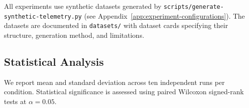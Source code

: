 All experiments use synthetic datasets generated by
\texttt{scripts/generate-synthetic-telemetry.py} (see
Appendix~\ref{app:experiment-configurations}). The datasets are documented in
\texttt{datasets/} with dataset cards specifying their structure, generation
method, and limitations.

\subsection{Statistical Analysis}

We report mean and standard deviation across ten independent runs per condition.
Statistical significance is assessed using paired Wilcoxon signed-rank tests at
$\alpha = 0.05$.
